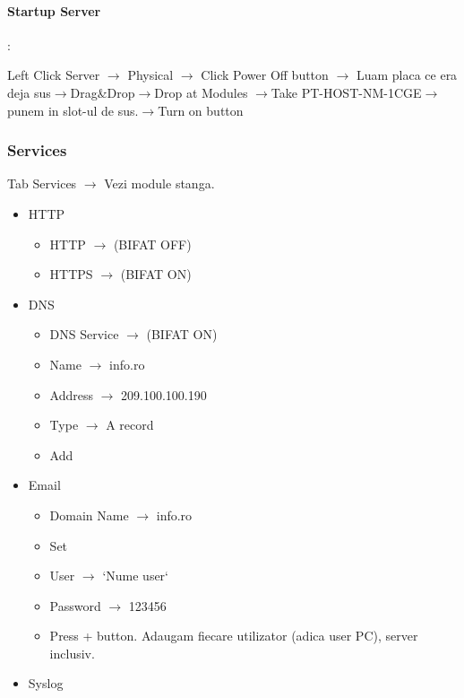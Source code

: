 \documentclass{article}
\begin{document}
\paragraph{Startup Server}:

Left Click Server $\rightarrow$ Physical $\rightarrow$ Click Power Off button $\rightarrow$ Luam placa ce era deja sus$\rightarrow$Drag\&Drop$\rightarrow$Drop at Modules $\rightarrow$Take PT-HOST-NM-1CGE$\rightarrow$ punem in slot-ul de sus.$\rightarrow$Turn on button

\subsubsection{Services}

Tab Services $\rightarrow$ Vezi module stanga.

\begin{itemize}
    \item HTTP
        \begin{itemize}
            \item  HTTP $\rightarrow$ (BIFAT OFF)
            \item  HTTPS $\rightarrow$ (BIFAT ON)
        \end{itemize}
    \item DNS
        \begin{itemize}
            \item DNS Service $\rightarrow$ (BIFAT ON)
            \item Name $\rightarrow$ info.ro
            \item Address $\rightarrow$ 209.100.100.190
            \item Type $\rightarrow$ A record
            \item Add
        \end{itemize}
    \item Email
        \begin{itemize}
            \item Domain Name $\rightarrow$ info.ro
            \item Set
            \item User $\rightarrow$ `Nume user`
            \item Password $\rightarrow$ 123456
            \item Press + button. Adaugam fiecare utilizator (adica user PC), server inclusiv.
        \end{itemize}
        \newpage
    \item Syslog
        \begin{itemize}

\end{itemize}
\end{itemize}
\end{document}
